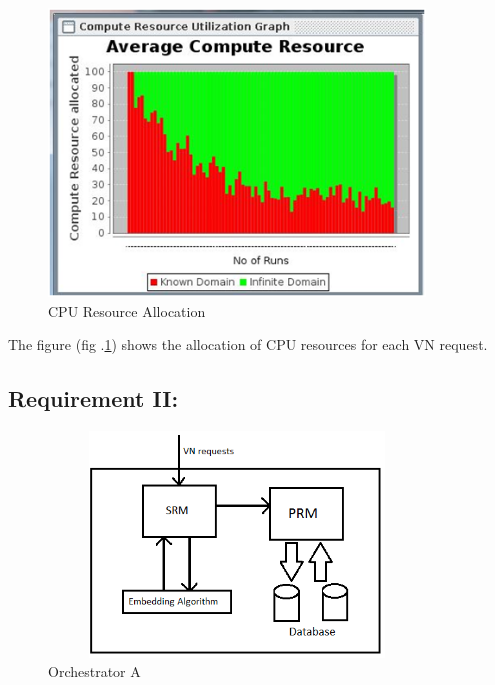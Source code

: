 \documentclass[article,dr=phil,type=msc ,colorback,accentcolor=tud4b]{tudthesis}
\begin{document}
\begin{figure}[h]
	\centering
	\includegraphics[width=10cm]{CPU_PE.png}
	\caption{CPU Resource Allocation}
	\label{cpu_alloc}
\end{figure}

The figure (fig .\ref{cpu_alloc}) shows the allocation of CPU resources for each VN request. 



\newpage
\subsection{Requirement II: }

\begin{figure}[h]
	\centering
	\includegraphics[width=10cm, height=6cm]{orch.jpg}
	\caption{Orchestrator A}
	\label{fig: Orchestrator A}
\end{figure}
\end{document}

